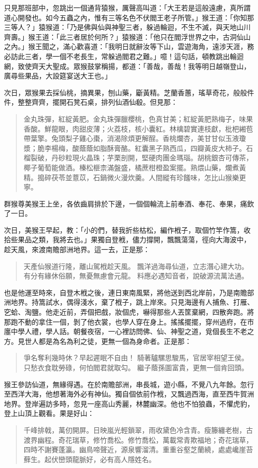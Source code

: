 只見那班部中，忽跳出一個通背猿猴，厲聲高叫道：「大王若是這般遠慮，真所謂道心開發也。如今五蟲之內，惟有三等名色不伏閻王老子所管。」猴王道：「你知那三等人？」猿猴道：「乃是佛與仙與神聖三者，躲過輪迴，不生不滅，與天地山川齊壽。」猴王道：「此三者居於何所？」猿猴道：「他只在閻浮世界之中，古洞仙山之內。」猴王聞之，滿心歡喜道：「我明日就辭汝等下山，雲遊海角，遠涉天涯，務必訪此三者，學一個不老長生，常躲過閻君之難。」噫！這句話，頓教跳出輪迴網，致使齊天大聖成。眾猴鼓掌稱揚，都道：「善哉，善哉！我等明日越嶺登山，廣尋些果品，大設筵宴送大王也。」

次日，眾猴果去採仙桃，摘異果，刨山藥，斸黃精。芝蘭香蕙，瑤草奇花，般般件件，整整齊齊，擺開石凳石桌，排列仙酒仙殽。但見那：
\begin{quote}
金丸珠彈，紅綻黃肥。金丸珠彈臘櫻桃，色真甘美；紅綻黃肥熟梅子，味果香酸。鮮龍眼，肉甜皮薄；火荔枝，核小囊紅。林檎碧實連枝獻，枇杷緗苞帶葉擎。兔頭梨子雞心棗，消渴除煩更解酲。香桃爛杏，美甘甘似玉液瓊漿；脆李楊梅，酸蔭蔭如脂酥膏酪。紅囊黑子熟西瓜，四瓣黃皮大柿子。石榴裂破，丹砂粒現火晶珠；芋栗剖開，堅硬肉團金瑪瑙。胡桃銀杏可傳茶，椰子葡萄能做酒。榛松榧柰滿盤盛，橘蔗柑橙盈案擺。熟煨山藥，爛煮黃精。搗碎茯苓並薏苡，石鍋微火漫炊羹。人間縱有珍饈味，怎比山猴樂更寧。
\end{quote}

群猴尊美猴王上坐，各依齒肩排於下邊，一個個輪流上前奉酒、奉花、奉果，痛飲了一日。

次日，美猴王早起，教：「小的們，替我折些枯松，編作栰子，取個竹竿作篙，收拾些果品之類，我將去也。」果獨自登栰，儘力撐開，飄飄蕩蕩，徑向大海波中，趁天風，來渡南贍部洲地界。這一去，正是那：
\begin{quote}
天產仙猴道行隆，離山駕栰趁天風。
飄洋過海尋仙道，立志潛心建大功。
有分有緣休俗願，無憂無慮會元龍。
料應必遇知音者，說破源流萬法通。
\end{quote}

也是他運至時來，自登木栰之後，連日東南風緊，將他送到西北岸前，乃是南贍部洲地界。持篙試水，偶得淺水，棄了栰子，跳上岸來。只見海邊有人捕魚、打雁、穵蛤、淘鹽。他走近前，弄個把戲，妝個虎，嚇得那些人丟筐棄網，四散奔跑。將那跑不動的拿住一個，剝了他衣裳，也學人穿在身上。搖搖擺擺，穿州過府，在市廛中學人禮，學人話。朝餐夜宿，一心裡訪問佛、仙、神聖之道，覓個長生不老之方。見世人都是為名為利之徒，更無一個為身命者。正是那：
\begin{quote}
爭名奪利幾時休？早起遲眠不自由！
騎著驢騾思駿馬，官居宰相望王侯。
只愁衣食耽勞碌，何怕閻君就取勾。
繼子蔭孫圖富貴，更無一個肯回頭。
\end{quote}

猴王參訪仙道，無緣得遇。在於南贍部洲，串長城，遊小縣，不覺八九年餘。忽行至西洋大海，他想著海外必有神仙。獨自個依前作栰，又飄過西海，直至西牛賀洲地界。登岸遍訪多時，忽見一座高山秀麗，林麓幽深。他也不怕狼蟲，不懼虎豹，登上山頂上觀看。果是好山：
\begin{quote}
千峰排戟，萬仞開屏。日映嵐光輕鎖翠，雨收黛色冷含青。瘦籐纏老樹，古渡界幽程。奇花瑞草，修竹喬松。修竹喬松，萬載常青欺福地；奇花瑞草，四時不謝賽蓬瀛。幽鳥啼聲近，源泉響溜清。重重谷壑芝蘭繞，處處巉崖苔蘚生。起伏巒頭龍脈好，必有高人隱姓名。
\end{quote}

